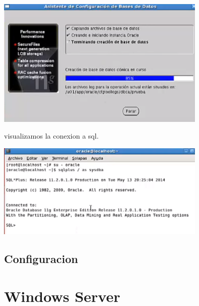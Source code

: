 \documentclass[12pt,letterpaper]{article}
\begin{document}
\begin{center}
\includegraphics[width=10cm]{oraclelinux/44.png}
\end{center}
visualizamos la conexion a sql.
\begin{center}
\includegraphics[width=10cm]{oraclelinux/46.png}
\end{center}


\subsection{Configuracion}


\newpage

\section{Windows Server}
\end{document}
